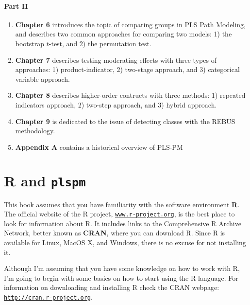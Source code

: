 \documentclass[12pt]{book}\usepackage{graphicx, color}
\newcommand{\plspm}{\texttt{plspm}}
\begin{document}
\paragraph{Part II}
\begin{enumerate}[leftmargin=*]
  \item[] \textbf{Chapter 6} introduces the topic of comparing groups in PLS Path Modeling, and describes two common approaches for comparing two models: 1) the bootstrap $t$-test, and 2) the permutation test.

  \item[] \textbf{Chapter 7} describes testing moderating effects with three types of approaches: 1) product-indicator, 2) two-stage approach, and 3) categorical variable approach.

  \item[] \textbf{Chapter 8} describes higher-order contructs with three methods: 1) repeated indicators approach, 2) two-step approach, and 3) hybrid approach.

  \item[] \textbf{Chapter 9} is dedicated to the issue of detecting classes with the REBUS methodology.
  
  \item[] \textbf{Appendix A} contains a historical overview of PLS-PM

\end{enumerate}





\section{R and \plspm{}}
This book assumes that you have familiarity with the software environment \textbf{R}. The official website of the R project, \texttt{\href{http://www.r-project.org}{www.r-project.org}}, is the best place to look for information about R. It includes links to the Comprehensive R Archive Network, better known as \textbf{CRAN}, where you can download R. Since R is available for Linux, MacOS X, and Windows, there is no excuse for not installing it. 

Although I'm assuming that you have some knowledge on how to work with R, I'm going to begin with some basics on how to start using the R language. For information on downloading and installing R check the CRAN webpage: \\ \texttt{\href{http://cran.r-project.org}{http://cran.r-project.org}}. 
\end{document}
